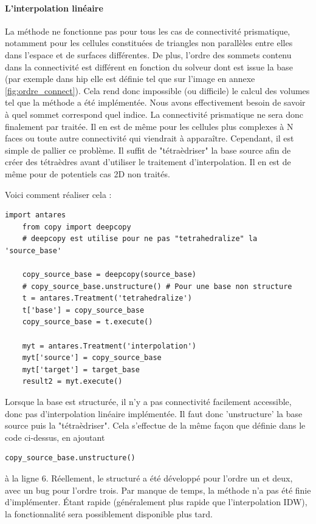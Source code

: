 \label{prisme}\paragraph{L'interpolation linéaire}

La méthode ne fonctionne pas pour tous les cas de connectivité prismatique, notamment pour les cellules constituées de triangles non parallèles entre elles dans l'espace et de surfaces différentes. De plus, l'ordre des sommets contenu dans la connectivité est différent en fonction du solveur dont est issue la base (par exemple dans hip elle est définie tel que sur l'image en annexe \ref{fig:ordre_connect}). Cela rend donc impossible (ou difficile) le calcul des volumes tel que la méthode a été implémentée. Nous avons effectivement besoin de savoir à quel sommet correspond quel indice. La connectivité prismatique ne sera donc finalement par traitée. Il en est de même pour les cellules plus complexes à N faces ou toute autre connectivité qui viendrait à apparaître.
Cependant, il est simple de pallier ce problème. Il suffit de "tétraèdriser" la base source afin de créer des tétraèdres avant d'utiliser le traitement d'interpolation. Il en est de même pour de potentiels cas 2D non traités.

Voici comment réaliser cela :

\begin{lstlisting}[caption=Tetrahedralize pour interpoler linéairement tous types de cellules, label={lst:tet}]
    import antares
    from copy import deepcopy
    # deepcopy est utilise pour ne pas "tetrahedralize" la 'source_base' 
    
    copy_source_base = deepcopy(source_base)
    # copy_source_base.unstructure() # Pour une base non structure
    t = antares.Treatment('tetrahedralize')
    t['base'] = copy_source_base
    copy_source_base = t.execute()

    myt = antares.Treatment('interpolation')
    myt['source'] = copy_source_base
    myt['target'] = target_base
    result2 = myt.execute()
\end{lstlisting}

Lorsque la base est structurée, il n'y a pas connectivité facilement accessible, donc pas d'interpolation linéaire implémentée. Il faut donc 'unstructure' la base source puis la "tétraèdriser". Cela s'effectue de la même façon que définie dans le code ci-dessus, en ajoutant 
\begin{lstlisting}[]
    copy_source_base.unstructure()
\end{lstlisting}
à la ligne 6. Réellement, le structuré a été développé pour l'ordre un et deux, avec un bug pour l'ordre trois. Par manque de temps, la méthode n'a pas été finie d'implémenter. Étant rapide (généralement plus rapide que l'interpolation IDW), la fonctionnalité sera possiblement disponible plus tard.


